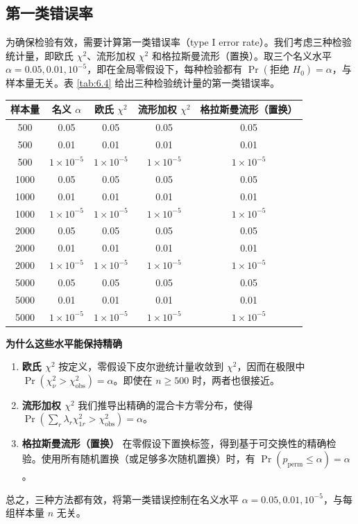\subsection{第一类错误率}

为确保检验有效，需要计算第一类错误率（type I error rate）。我们考虑三种检验统计量，即欧氏 $\chi^2$、流形加权 $\chi^2$ 和格拉斯曼流形（置换）。取三个名义水平 $\alpha=0.05,0.01,10^{-5}$，即在全局零假设下，每种检验都有 $\Pr(\text{拒绝 }H_0)=\alpha$，与样本量无关。表 \ref{tab:6.4} 给出三种检验统计量的第一类错误率。

\begin{table}[htbp]
  \centering\small
  \begin{tabular}{ccccc}
    \toprule
    样本量 & 名义 $\alpha$ & 欧氏 $\chi^2$ & 流形加权 $\chi^2$ & 格拉斯曼流形（置换）\\
    \midrule
    500  & 0.05 & 0.05 & 0.05 & 0.05\\
    500  & 0.01 & 0.01 & 0.01 & 0.01\\
    500  & $1\times10^{-5}$ & $1\times10^{-5}$ & $1\times10^{-5}$ & $1\times10^{-5}$\\
    1000 & 0.05 & 0.05 & 0.05 & 0.05\\
    1000 & 0.01 & 0.01 & 0.01 & 0.01\\
    1000 & $1\times10^{-5}$ & $1\times10^{-5}$ & $1\times10^{-5}$ & $1\times10^{-5}$\\
    2000 & 0.05 & 0.05 & 0.05 & 0.05\\
    2000 & 0.01 & 0.01 & 0.01 & 0.01\\
    2000 & $1\times10^{-5}$ & $1\times10^{-5}$ & $1\times10^{-5}$ & $1\times10^{-5}$\\
    5000 & 0.05 & 0.05 & 0.05 & 0.05\\
    5000 & 0.01 & 0.01 & 0.01 & 0.01\\
    5000 & $1\times10^{-5}$ & $1\times10^{-5}$ & $1\times10^{-5}$ & $1\times10^{-5}$\\
    \bottomrule
  \end{tabular}
\end{table}

\textbf{为什么这些水平能保持精确}
\begin{enumerate}
  \item \textbf{欧氏 $\chi^2$} 按定义，零假设下皮尔逊统计量收敛到 $\chi^2$，因而在极限中 $\Pr(\chi_\nu^2>\chi_{\mathrm{obs}}^2)=\alpha$。即使在 $n\geq 500$ 时，两者也很接近。
  \item \textbf{流形加权 $\chi^2$} 我们推导出精确的混合卡方零分布，使得 $\Pr(\sum_r\lambda_r\chi_{1r}^2>\chi_{\mathrm{obs}}^2)=\alpha$。
  \item \textbf{格拉斯曼流形（置换）} 在零假设下置换标签，得到基于可交换性的精确检验。使用所有随机置换（或足够多次随机置换）时，有 $\Pr(p_{\mathrm{perm}}\leq\alpha)=\alpha$。
\end{enumerate}
总之，三种方法都有效，将第一类错误控制在名义水平 $\alpha=0.05,0.01,10^{-5}$，与每组样本量 $n$ 无关。
